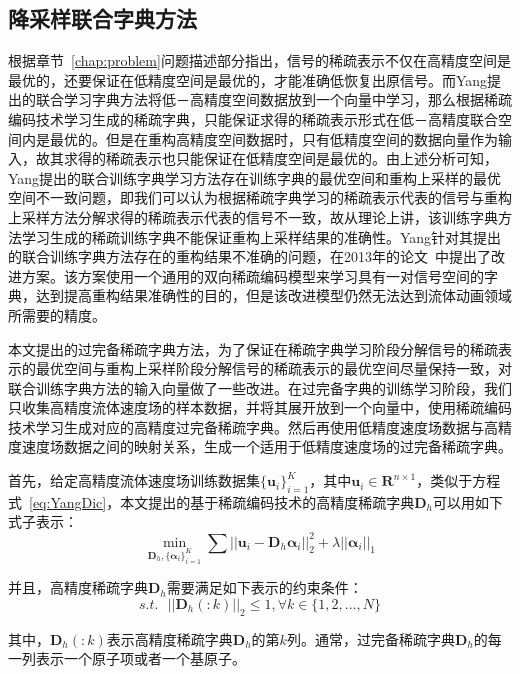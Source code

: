 \subsection{降采样联合字典方法}

根据章节~\ref{chap:problem}问题描述部分指出，信号的稀疏表示不仅在高精度空间是最优的，还要保证在低精度空间是最优的，才能准确低恢复出原信号。而Yang提出的联合学习字典方法将低－高精度空间数据放到一个向量中学习，那么根据稀疏编码技术学习生成的稀疏字典，只能保证求得的稀疏表示形式在低－高精度联合空间内是最优的。但是在重构高精度空间数据时，只有低精度空间的数据向量作为输入，故其求得的稀疏表示也只能保证在低精度空间是最优的。由上述分析可知，Yang提出的联合训练字典学习方法存在训练字典的最优空间和重构上采样的最优空间不一致问题，即我们可以认为根据稀疏字典学习的稀疏表示代表的信号与重构上采样方法分解求得的稀疏表示代表的信号不一致，故从理论上讲，该训练字典方法学习生成的稀疏训练字典不能保证重构上采样结果的准确性。Yang针对其提出的联合训练字典方法存在的重构结果不准确的问题，在2013年的论文~\cite{yang2012bilevel}中提出了改进方案。该方案使用一个通用的双向稀疏编码模型来学习具有一对信号空间的字典，达到提高重构结果准确性的目的，但是该改进模型仍然无法达到流体动画领域所需要的精度。

本文提出的过完备稀疏字典方法，为了保证在稀疏字典学习阶段分解信号的稀疏表示的最优空间与重构上采样阶段分解信号的稀疏表示的最优空间尽量保持一致，对联合训练字典方法的输入向量做了一些改进。在过完备字典的训练学习阶段，我们只收集高精度流体速度场的样本数据，并将其展开放到一个向量中，使用稀疏编码技术学习生成对应的高精度过完备稀疏字典。然后再使用低精度速度场数据与高精度速度场数据之间的映射关系，生成一个适用于低精度速度场的过完备稀疏字典。

首先，给定高精度流体速度场训练数据集$\{\boldsymbol u_i\}_{i = 1}^K$，其中$\boldsymbol u_i \in \boldsymbol R^{n \times 1}$，类似于方程式~\ref{eq:YangDic}，本文提出的基于稀疏编码技术的高精度稀疏字典$\boldsymbol D_h$可以用如下式子表示：
\begin{equation}
\label{eq:trainning}
\min_{\boldsymbol D_h,\{\boldsymbol \alpha_i\}_{i = 1}^K} \sum||\boldsymbol u_i - \boldsymbol D_h\boldsymbol \alpha_i||_2^2 + \lambda ||\boldsymbol \alpha_i||_1
\end{equation}

并且，高精度稀疏字典$\boldsymbol D_h$需要满足如下表示的约束条件：
\begin{equation}
\label{eq:condition}
s.t. \ \ \ ||\boldsymbol D_h(:k)||_2 \le 1, \forall k \in \{1, 2, ...,N\}
\end{equation}

其中，$\boldsymbol D_h(:k)$表示高精度稀疏字典$\boldsymbol D_h$的第$k$列。通常，过完备稀疏字典$\boldsymbol D_h$的每一列表示一个原子项或者一个基原子。

